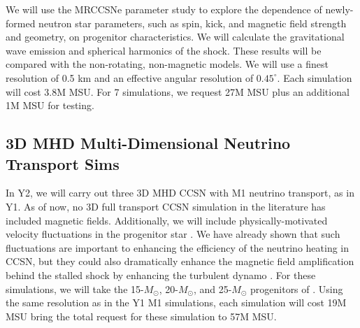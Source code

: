 \begin{comment}
Previous studies of MRCCSNe in 2D \citep{Burrows:2007gu} and 3D \citep{Winteler:2012fv} have amplified the initial magnetic fields so that the post-bounce fields are of order the estimated MRI-saturation field strengths. 
Despite what may be reasonable final field strengths, by neglecting the exponential growth of the MRI, these previous studies get the wrong field growth history and geometry. 
The proposed work will, for the first time, eliminate this arbitrary history of field growth associated with unphysical initial magnetic fields and subsequent unphysically slow growth rates.  
We will employ a sub-grid model that approximates the amplification due to the MRI using the linear theory of the MRI fastest-growing mode. 
Semi-global simulations in the context of CCSNe show that the overall growth of the MRI is dominated by the fastest-growing mode \citep{Obergaulinger:2009fv}. 
Our sub-grid model will allow us to capture the time- and space-dependent amplification of the magnetic field due to the MRI in a realistic way without needing to resolve the length scale of the fastest-growing mode. 
This model will be calibrated and tuned to match the results of the MRI-resolved simulation of Y1 (\S\ref{sec:mriSim}).
\end{comment}

We will use the MRCCSNe parameter study to explore the dependence of newly-formed neutron star parameters, such as spin, kick, and magnetic field strength and geometry, on progenitor characteristics. 
We will calculate the gravitational wave emission and spherical harmonics of the shock. 
These results will be compared with the non-rotating, non-magnetic models. 
We will use a finest resolution of 0.5 km and an effective angular resolution of $0.45^\circ$.
Each simulation will cost 3.8M MSU.  For 7 simulations, we request 27M MSU plus an additional 1M MSU for testing.

\subsection{3D MHD Multi-Dimensional Neutrino Transport Sims}
\label{sec:enhancedM1}

In Y2, we will carry out three 3D MHD CCSN with M1 neutrino transport, as in Y1.
As of now, no 3D full transport CCSN simulation in the literature has included magnetic fields.
Additionally, we will include physically-motivated velocity fluctuations in the progenitor star \citep{Couch:2013bl, Chatzopoulos:2014uj}.
We have already shown that such fluctuations are important to enhancing the efficiency of the neutrino heating in CCSN, but they could also dramatically enhance the magnetic field amplification behind the stalled shock by enhancing the turbulent dynamo \citep[e.g.][]{Endeve:2012ht}.
For these simulations, we will take the 15-$M_\odot$, 20-$M_\odot$, and 25-$M_\odot$ progenitors of \citet{Heger:2005bi}.
Using the same resolution as in the Y1 M1 simulations, each simulation will cost 19M MSU bring the total request for these simulation to 57M MSU.

